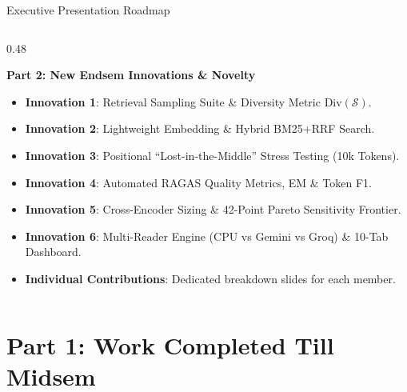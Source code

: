 \documentclass[10pt,aspectratio=169]{beamer}
\begin{document}
\begin{frame}{Executive Presentation Roadmap}
\begin{columns}[onlytextwidth,T]
        \begin{column}{0.48\textwidth}
            \begin{block}{\textbf{Part 2: New Endsem Innovations \& Novelty}}
                \footnotesize
                \begin{itemize}\setlength\itemsep{1.5pt}
                    \item \textbf{Innovation 1}: Retrieval Sampling Suite \& Diversity Metric $\text{Div}(\mathcal{S})$.
                    \item \textbf{Innovation 2}: Lightweight Embedding \& Hybrid BM25+RRF Search.
                    \item \textbf{Innovation 3}: Positional ``Lost-in-the-Middle'' Stress Testing (10k Tokens).
                    \item \textbf{Innovation 4}: Automated RAGAS Quality Metrics, EM \& Token F1.
                    \item \textbf{Innovation 5}: Cross-Encoder Sizing \& 42-Point Pareto Sensitivity Frontier.
                    \item \textbf{Innovation 6}: Multi-Reader Engine (CPU vs Gemini vs Groq) \& 10-Tab Dashboard.
                    \item \textbf{Individual Contributions}: Dedicated breakdown slides for each member.
                \end{itemize}
            \end{block}
        \end{column}
    \end{columns}
\end{frame}

\section{Part 1: Work Completed Till Midsem}
\end{document}
